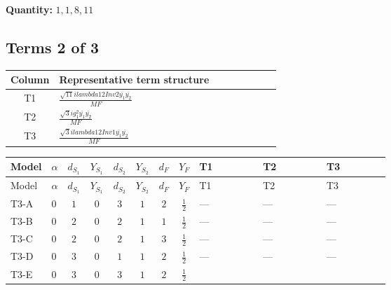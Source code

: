 \documentclass[8pt]{article}
\begin{document}
\begin{landscape}
\begin{longtable}{@{}llcccccc >{\raggedright\arraybackslash}p{0.21\linewidth} >{\raggedright\arraybackslash}p{0.21\linewidth} >{\raggedright\arraybackslash}p{0.21\linewidth}@{}}
\midrule
\bottomrule
\end{longtable}
\clearpage
\noindent\textbf{Quantity: }$\mathrm{1,1,8,11}$\par\smallskip
\subsection*{Terms 2 of 3}
\begin{center}
\begin{tabular}{@{}c >{\raggedright\arraybackslash}p{0.82\linewidth}@{}}
\toprule
Column & Representative term structure \\
\midrule
T1 & \(\displaystyle \frac{\sqrt{11} i lambda12Inv2 \overline{y_{1}} \overline{y_{2}}}{MF}\) \\
\midrule
T2 & \(\displaystyle \frac{\sqrt{3} i g_{1}^{2} \overline{y_{1}} \overline{y_{2}}}{MF}\) \\
\midrule
T3 & \(\displaystyle \frac{\sqrt{3} i lambda12Inv1 \overline{y_{1}} \overline{y_{2}}}{MF}\) \\
\midrule
\bottomrule
\end{tabular}
\end{center}
\smallskip
\tiny
\begin{longtable}{@{}llcccccc >{\raggedright\arraybackslash}p{0.21\linewidth} >{\raggedright\arraybackslash}p{0.21\linewidth} >{\raggedright\arraybackslash}p{0.21\linewidth}@{}}
\toprule
Model & $\alpha$ & $d_{S_1}$ & $Y_{S_1}$ & $d_{S_2}$ & $Y_{S_2}$ & $d_F$ & $Y_F$ & T1 & T2 & T3 \\
\midrule
\endfirsthead
\toprule
Model & $\alpha$ & $d_{S_1}$ & $Y_{S_1}$ & $d_{S_2}$ & $Y_{S_2}$ & $d_F$ & $Y_F$ & T1 & T2 & T3 \\
\midrule
\endhead
T3-A & $0$ & $1$ & $0$ & $3$ & $1$ & $2$ & $\frac{1}{2}$ & --- & --- & --- \\
\midrule
T3-B & $0$ & $2$ & $0$ & $2$ & $1$ & $1$ & $\frac{1}{2}$ & --- & --- & --- \\
\midrule
T3-C & $0$ & $2$ & $0$ & $2$ & $1$ & $3$ & $\frac{1}{2}$ & --- & --- & --- \\
\midrule
T3-D & $0$ & $3$ & $0$ & $1$ & $1$ & $2$ & $\frac{1}{2}$ & --- & --- & --- \\
\midrule
T3-E & $0$ & $3$ & $0$ & $3$ & $1$ & $2$ & $\frac{1}{2}$ & \scriptsize\adjustbox{max width=\linewidth}{$\begin{gathered} - \frac{3 \sqrt{11} i lambda12Inv2 \overline{y_{1}} \overline{y_{2}}}{22 MF}\end{gathered}$} & \scriptsize\adjustbox{max width=\linewidth}{$\begin{gathered} - \frac{\sqrt{3} i g_{1}^{2} \overline{y_{1}} \overline{y_{2}}}{8 MF}\end{gathered}$} & \scriptsize\adjustbox{max width=\linewidth}{$\begin{gathered} \frac{\sqrt{3} i lambda12Inv1 \overline{y_{1}} \overline{y_{2}}}{6 MF}\end{gathered}$} \\

\end{longtable}
\end{landscape}
\end{document}
